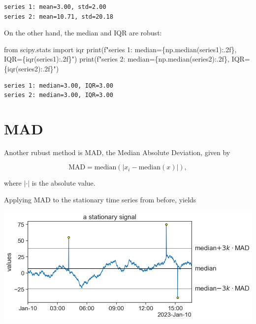 \documentclass[
  letterpaper,
  DIV=11,
  numbers=noendperiod,
  oneside]{scrreprt}
\newenvironment{Shaded}{\begin{snugshade}}{\end{snugshade}}
\newcommand{\BuiltInTok}[1]{\textcolor[rgb]{0.00,0.23,0.31}{#1}}
\newcommand{\ImportTok}[1]{\textcolor[rgb]{0.00,0.46,0.62}{#1}}
\newcommand{\NormalTok}[1]{\textcolor[rgb]{0.00,0.23,0.31}{#1}}
\newcommand{\SpecialCharTok}[1]{\textcolor[rgb]{0.37,0.37,0.37}{#1}}
\newcommand{\SpecialStringTok}[1]{\textcolor[rgb]{0.13,0.47,0.30}{#1}}
\begin{document}
\begin{verbatim}
series 1: mean=3.00, std=2.00
series 2: mean=10.71, std=20.18
\end{verbatim}

On the other hand, the median and IQR are robust:

\begin{Shaded}
\begin{Highlighting}[]
\ImportTok{from}\NormalTok{ scipy.stats }\ImportTok{import}\NormalTok{ iqr}
\BuiltInTok{print}\NormalTok{(}\SpecialStringTok{f"series 1: median=}\SpecialCharTok{\{}\NormalTok{np}\SpecialCharTok{.}\NormalTok{median(series1)}\SpecialCharTok{:.2f\}}\SpecialStringTok{, IQR=}\SpecialCharTok{\{}\NormalTok{iqr(series1)}\SpecialCharTok{:.2f\}}\SpecialStringTok{"}\NormalTok{)}
\BuiltInTok{print}\NormalTok{(}\SpecialStringTok{f"series 2: median=}\SpecialCharTok{\{}\NormalTok{np}\SpecialCharTok{.}\NormalTok{median(series2)}\SpecialCharTok{:.2f\}}\SpecialStringTok{, IQR=}\SpecialCharTok{\{}\NormalTok{iqr(series2)}\SpecialCharTok{:.2f\}}\SpecialStringTok{"}\NormalTok{)}
\end{Highlighting}
\end{Shaded}

\begin{verbatim}
series 1: median=3.00, IQR=3.00
series 2: median=3.00, IQR=3.00
\end{verbatim}

\hypertarget{mad}{%
\section{MAD}\label{mad}}

Another rubust method is MAD, the Median Absolute Deviation, given by

\[
\text{MAD} = \text{median}(\left| x_i - \text{median}(x)  \right|),
\]

where \(|\cdot|\) is the absolute value.

Applying MAD to the stationary time series from before, yields

\includegraphics{outliers/outliers_MAD_stationary.png}
\end{document}
